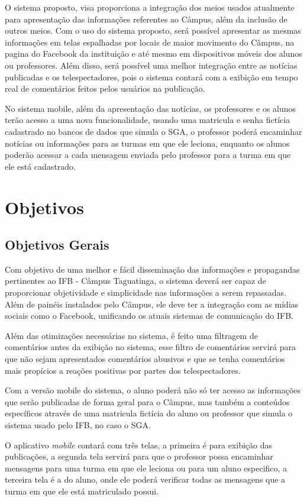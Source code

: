 O sistema proposto, visa proporciona a integração dos meios usados atualmente para apresentação das informações referentes ao Câmpus, além da inclusão de outros meios. Com o uso do sistema proposto, será possível apresentar as mesmas informações
em telas espalhadas por locais de maior movimento do Câmpus, na pagina do Facebook
da instituição e até mesmo em dispositivos móveis dos alunos ou professores. Além disso, será possível uma melhor integração entre as notícias publicadas e os telespectadores, pois o sistema contará com a exibição em tempo real de comentários feitos pelos usuários na publicação.

No sistema mobile, além da apresentação das notícias, os professores e os alunos terão acesso a uma nova funcionalidade, usando uma matricula e senha fictícia cadastrado no bancos de dados que simula o SGA, o professor poderá encaminhar notícias ou informações para as turmas em que ele leciona, enquanto os alunos poderão acessar a cada mensagem enviada pelo professor para a turma em que ele está cadastrado.

\section{Objetivos}
\subsection{Objetivos Gerais}
Com objetivo de uma melhor e fácil disseminação das informações e propagandas pertinentes ao IFB - Câmpus Taguatinga, o sistema deverá ser capaz de proporcionar objetividade e simplicidade nas informações a serem repassadas. Além de painéis instalados pelo Câmpus, ele deve ter a integração com as mídias sociais como o Facebook, unificando os atuais sistemas de comunicação do IFB.

Além das otimizações necessárias no sistema, é feito uma filtragem de comentários antes da exibição no sistema, esse filtro de comentários servirá para que não sejam apresentados comentários abusivos e que se tenha comentários mais propícios a reações positivas por partes dos telespectadores.

Com a versão mobile do sistema, o aluno poderá não só ter acesso as informações que serão publicadas de forma geral para o Câmpus, mas também a conteúdos específicos através de uma matricula fictícia do aluno ou professor que simula o sistema usado pelo IFB, no caso o SGA. 

O aplicativo \textit{mobile} contará com três telas, a primeira é para exibição das publicações, a segunda tela servirá para que o professor possa encaminhar mensagens para uma turma em que ele leciona ou para um aluno especifico, a terceira tela é a do aluno, onde ele poderá verificar todas as mensagens que a turma em que ele está matriculado possui.

